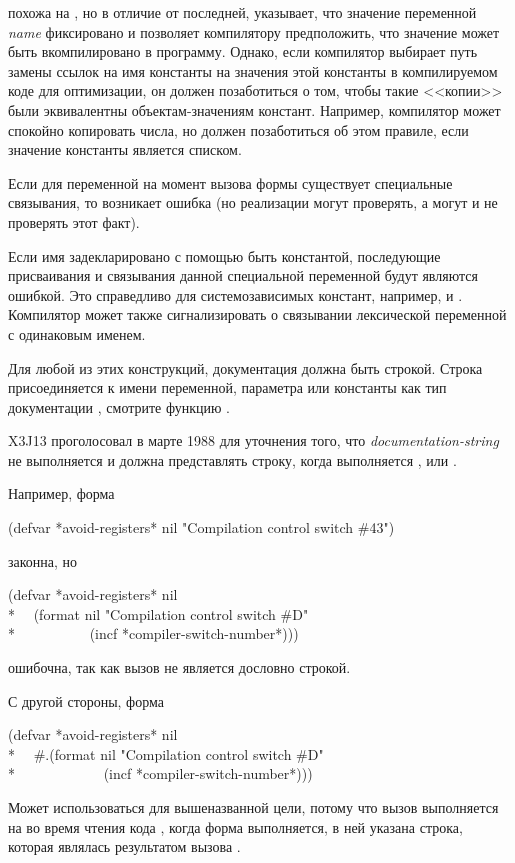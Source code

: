 \begin{defmac}
 похожа на , но в отличие от последней,
указывает, что значение переменной \emph{name} фиксировано и позволяет
компилятору предположить, что значение может быть вкомпилировано в
программу. Однако, если компилятор выбирает путь замены ссылок на имя константы
на значения этой константы в компилируемом коде для оптимизации, он должен
позаботиться о том, чтобы такие <<копии>> были эквивалентны 
объектам-значениям констант. Например, компилятор может спокойно копировать
числа, но должен позаботиться об этом правиле, если значение константы
является списком.

Если для переменной на момент вызова формы  существует
специальные связывания, то возникает ошибка (но реализации могут проверять, а
могут и не проверять этот факт).

Если имя задекларировано с помощью  быть константой,
последующие присваивания и связывания данной специальной переменной будут
являются ошибкой. Это справедливо для системозависимых констант, например,
 и .
Компилятор может также сигнализировать о связывании лексической переменной с
одинаковым именем.

Для любой из этих конструкций, документация должна быть строкой. Строка
присоединяется к имени переменной, параметра или константы как тип документации
, смотрите функцию .

\begin{new}
X3J13 проголосовал в марте 1988
для уточнения того, что \emph{documentation-string}
не выполняется и должна представлять строку, когда выполняется ,
 или .

Например, форма
\begin{lisp}
(defvar *avoid-registers* nil "Compilation control switch \#43")
\end{lisp}
законна, но
\begin{lisp}
(defvar *avoid-registers* nil \\*
~~(format nil "Compilation control switch \#{\Xtilde}D" \\*
~~~~~~~~~~(incf *compiler-switch-number*)))
\end{lisp}
ошибочна, так как вызов  не является дословно строкой.

С другой стороны, форма
\begin{lisp}
(defvar *avoid-registers* nil \\*
~~\#.(format nil "Compilation control switch \#{\Xtilde}D" \\*
~~~~~~~~~~~~(incf *compiler-switch-number*)))
\end{lisp}
Может использоваться для вышеназванной цели, потому что вызов 
выполняется на во время чтения кода , когда форма 
выполняется, в ней указана строка, которая являлась результатом вызова
.
\end{new}


\end{defmac}
